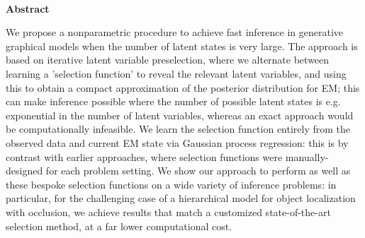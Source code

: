 \documentclass[12pt]{article}
\begin{document}
\thispagestyle{empty}
%
\ \vspace{-0mm}\\
%
\begin{center} 
{\bf Abstract} 
\end{center}
We propose a nonparametric procedure to achieve fast inference in generative graphical models when the number of latent states is very large.
 The approach is based on iterative latent variable preselection, where we alternate between learning a 'selection function' to reveal the relevant latent variables, and using this to obtain a compact approximation of the posterior distribution for EM; this can make inference possible where the number of possible latent states is e.g. exponential in the number of latent variables, whereas an exact approach would be computationally infeasible.
We learn the selection function entirely from the observed data and current EM state via Gaussian process regression: this is by contrast with earlier approaches, where selection functions were manually-designed for each problem setting.
We show our approach to perform as well as these bespoke selection functions on a wide variety of inference problems: in particular, for the challenging case of a hierarchical model for object localization with occlusion, we achieve results that match a customized state-of-the-art selection method,  at a far lower computational cost.







\iffalse
\section{Citations}
The citations must follow the APA format. A typical citation is given by $\backslash citep$, for example \citep{Ref2009}. The command $\backslash cite$ will generate \cite{Ref2009}. For references with multiple authors, the command $\backslash citet$ will generate \citet{Ref2008} and $\backslash citep$ will generate \citep{Ref2008}. To put texts in the reference, use command $\backslash citep[see, e.g.,][for instance]\{Ref2009\}$ which generates \citep[see,
e.g.,][for instance]{Ref2009}. To cite multiple references, use the command $\backslash citep\{ref1,ref2,ref3\}$, for example \citep[compare][]{Ref2008,Ref2009}.
For Neural Computation, the $\backslash citep$ is preferred.
\fi
\end{document}
